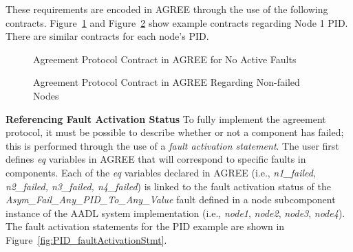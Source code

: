 These requirements are encoded in AGREE through the use of the following contracts. Figure~\ref{fig:PIDContract1} and Figure~\ref{fig:PIDContract2} show example contracts regarding Node 1 PID. There are similar contracts for each node's PID. 
\begin{figure}[!htb]
        \caption{\label{fig:PIDContract1} Agreement Protocol Contract in AGREE for No Active Faults}
\end{figure}

\begin{figure}[!htb]
        \caption{\label{fig:PIDContract2} Agreement Protocol Contract in AGREE Regarding Non-failed Nodes}
\end{figure}


\textbf{Referencing Fault Activation Status}
To fully implement the agreement protocol, it must be possible to describe whether or not a component has failed; this is performed through the use of a \textit{fault activation statement}. The user first defines \textit{eq} variables in AGREE that will correspond to specific faults in components. Each of the \textit{eq} variables declared in AGREE (i.e., \textit{n1\_failed, n2\_failed, n3\_failed, n4\_failed}) is linked to the fault activation status of the \textit{Asym\_Fail\_Any\_PID\_To\_Any\_Value} fault defined in a node subcomponent instance of the %
AADL system implementation (i.e., \textit{node1}, \textit{node2}, \textit{node3}, \textit{node4}). The fault activation statements for the PID example are shown in Figure~\ref{fig:PID_faultActivationStmt}.

